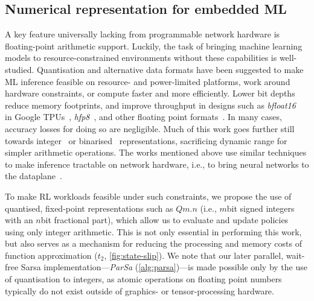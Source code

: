 \documentclass[
sigconf,natbib=false
]{acmart}
\newcounter{insightc}
\newenvironment{insight}
	{
		\begin{tipblock}\refstepcounter{insightc}\textbf{Insight \theinsightc:}\em
	}
	{
		\end{tipblock}
	}
\begin{document}

\subsection{Numerical representation for embedded ML}
A key feature universally lacking from programmable network hardware is floating-point arithmetic support.
Luckily, the task of bringing machine learning models to resource-constrained environments without these capabilities is well-studied.
Quantisation and alternative data formats have been suggested to make ML inference feasible on resource- and power-limited platforms, work around hardware constraints, or compute faster and more efficiently.
Lower bit depths reduce memory footprints, and improve throughput in designs such as \emph{bfloat16}~\parencite{bfloat16-blog} in Google TPUs~\parencite{DBLP:journals/sigops/XieDMKVZT18}, \emph{hfp8}~\parencite{DBLP:conf/nips/SunCCWVSCZG19}, and other floating point formats~\parencite{DBLP:journals/corr/abs-2007-01530}.
In many cases, accuracy losses for doing so are negligible.
Much of this work goes further still towards integer~\parencite{tensorrt-8bit} or binarised~\parencite{DBLP:journals/corr/MiyashitaLM16,DBLP:conf/eccv/RastegariORF16,DBLP:journals/corr/KimS16,DBLP:conf/nips/HubaraCSEB16} representations, sacrificing dynamic range for simpler arithmetic operations.
The works mentioned above use similar techniques to make inference tractable on network hardware, i.e., to bring neural networks to the dataplane~\parencite{DBLP:journals/corr/abs-2009-02353,DBLP:conf/sigcomm/SanvitoSB18,DBLP:journals/corr/abs-1801-05731}.

To make RL workloads feasible under such constraints, we propose the use of quantised, fixed-point representations such as $Qm.n$ (i.e., $m$\si{bit} signed integers with an $n$\si{bit} fractional part), which allow us to evaluate and update policies using only integer arithmetic.
This is not only essential in performing this work, but also serves as a mechanism for reducing the processing and memory costs of function approximation ($t_2$, \cref{fig:state-slip}).
We note that our later parallel, wait-free Sarsa implementation---\emph{ParSa} (\cref{alg:parsa})---is made possible only by the use of quantisation to integers, as atomic operations on floating point numbers typically do not exist outside of graphics- or tensor-processing hardware.
\end{document}
